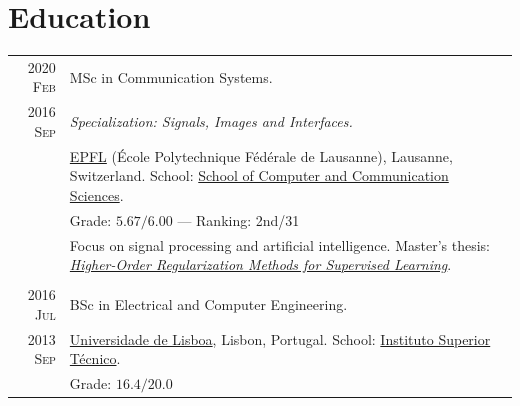 \documentclass[a4paper,11pt]{article}
\begin{document}
  \section{Education}

    \begin{tabular}{r|p{13cm}}


      \textsc{2020 Feb}  &
      MSc in Communication Systems. \\
      \textsc{2016 Sep} & \emph{Specialization: Signals, Images and Interfaces.} \\
      & \footnotesize{\href{https://www.epfl.ch/en/}{EPFL} (École Polytechnique Fédérale de Lausanne), Lausanne, Switzerland. \newline
      School: \href{https://www.epfl.ch/schools/ic/}{School of Computer and Communication Sciences}.
      } \\
      & \footnotesize{
      Grade: $\bm{5.67/6.00}$} — Ranking: 2nd/31 \\
      & \footnotesize{
        Focus on signal processing and artificial intelligence. \newline
        Master's thesis: \href{https://www.joaquimcampos.com/assets/pubs/MSc_thesis.pdf}{\emph{Higher-Order Regularization Methods for Supervised Learning}}. 
      } \\
      \multicolumn{2}{c}{} \\

      \textsc{\phantom{5}2016 Jul} &
      BSc in Electrical and Computer Engineering. \\
      \textsc{2013 Sep} &  \footnotesize{
        \href{https://www.ulisboa.pt/en}{Universidade de Lisboa}, Lisbon, Portugal. \newline
        School: \href{https://tecnico.ulisboa.pt/en/}{Instituto Superior Técnico}.
      } \\
      & \footnotesize{Grade: $\bm{16.4/20.0}$}
    \end{tabular}
\end{document}

